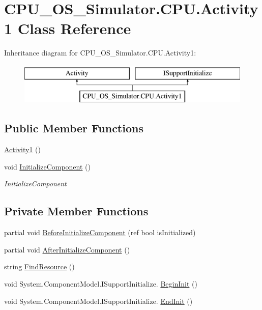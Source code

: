 \hypertarget{class_c_p_u___o_s___simulator_1_1_c_p_u_1_1_activity1}{}\section{C\+P\+U\+\_\+\+O\+S\+\_\+\+Simulator.\+C\+P\+U.\+Activity1 Class Reference}
\label{class_c_p_u___o_s___simulator_1_1_c_p_u_1_1_activity1}
Inheritance diagram for C\+P\+U\+\_\+\+O\+S\+\_\+\+Simulator.\+C\+P\+U.\+Activity1\+:\begin{figure}[H]
\begin{center}
\leavevmode
\includegraphics[height=2.000000cm]{class_c_p_u___o_s___simulator_1_1_c_p_u_1_1_activity1}
\end{center}
\end{figure}
\subsection*{Public Member Functions}
\begin{DoxyCompactItemize}
\item 
\hyperlink{class_c_p_u___o_s___simulator_1_1_c_p_u_1_1_activity1_afb3ce8aeef1cfe7c4a479f43327d5ea1}{Activity1} ()
\item 
void \hyperlink{class_c_p_u___o_s___simulator_1_1_c_p_u_1_1_activity1_a1a8dbcc92b48b1ca04bb667e96a89b10}{Initialize\+Component} ()
\begin{DoxyCompactList}\small\item\em Initialize\+Component \end{DoxyCompactList}\end{DoxyCompactItemize}
\subsection*{Private Member Functions}
\begin{DoxyCompactItemize}
\item 
partial void \hyperlink{class_c_p_u___o_s___simulator_1_1_c_p_u_1_1_activity1_a40e21e1735bdef0af255ee9f07fcb3d8}{Before\+Initialize\+Component} (ref bool is\+Initialized)
\item 
partial void \hyperlink{class_c_p_u___o_s___simulator_1_1_c_p_u_1_1_activity1_af4be750af1e09a820a79d78faf6caf4f}{After\+Initialize\+Component} ()
\item 
string \hyperlink{class_c_p_u___o_s___simulator_1_1_c_p_u_1_1_activity1_a841192007ebd277cd3e86f47e8d9c04b}{Find\+Resource} ()
\item 
void System.\+Component\+Model.\+I\+Support\+Initialize. \hyperlink{class_c_p_u___o_s___simulator_1_1_c_p_u_1_1_activity1_ae02f7230ddf93bd55c74ad47d9dc72e5}{Begin\+Init} ()
\item 
void System.\+Component\+Model.\+I\+Support\+Initialize. \hyperlink{class_c_p_u___o_s___simulator_1_1_c_p_u_1_1_activity1_a7d9c8128517a9b4a1a8860b3cc8ffd43}{End\+Init} ()
\end{DoxyCompactItemize}
